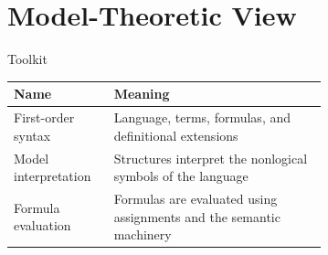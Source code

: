 \section{Model-Theoretic View}

\begin{toolkitbox}{Toolkit}
\small
\begin{tabular}{l p{0.68\linewidth}}
\toprule
\textbf{Name} & \textbf{Meaning} \\
\midrule
First-order syntax & Language, terms, formulas, and definitional extensions \\
Model interpretation & Structures interpret the nonlogical symbols of the language \\
Formula evaluation & Formulas are evaluated using assignments and the semantic machinery \\
\bottomrule
\end{tabular}
\end{toolkitbox}




